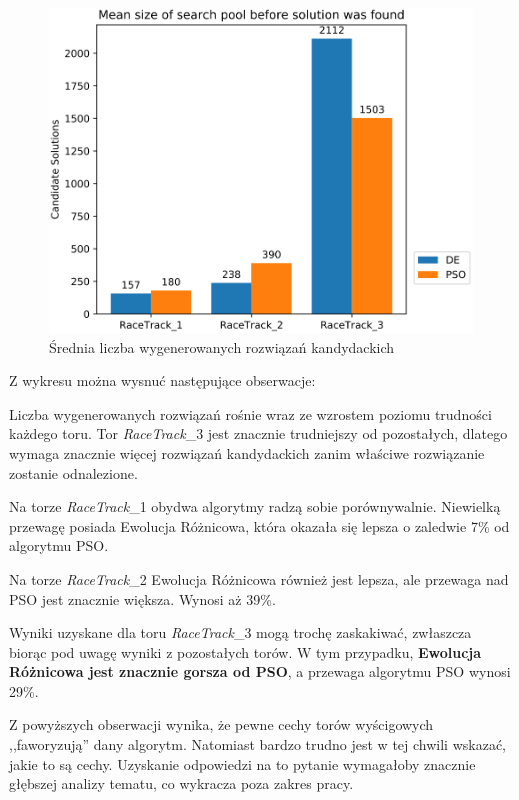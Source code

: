 \vspace{1cm}
\begin{figure}[H]
\centering
\includegraphics[width=15cm]{resources/figures/search_count.png}
\caption{Średnia liczba wygenerowanych rozwiązań kandydackich}
\label{SearchCount}
\end{figure}

Z wykresu można wysnuć następujące obserwacje:
\begin{enumerate*}
\item Liczba wygenerowanych rozwiązań rośnie wraz ze wzrostem poziomu trudności każdego toru. Tor \textit{RaceTrack}\_3 jest znacznie trudniejszy od pozostałych, dlatego wymaga znacznie więcej rozwiązań kandydackich zanim właściwe rozwiązanie zostanie odnalezione.
\item Na torze \textit{RaceTrack}\_1 obydwa algorytmy radzą sobie porównywalnie. Niewielką przewagę posiada Ewolucja Różnicowa, która okazała się lepsza o zaledwie 7\% od algorytmu PSO.
\item Na torze \textit{RaceTrack}\_2 Ewolucja Różnicowa również jest lepsza, ale przewaga nad PSO jest znacznie większa. Wynosi aż 39\%.
\item Wyniki uzyskane dla toru \textit{RaceTrack}\_3 mogą trochę zaskakiwać, zwłaszcza biorąc pod uwagę wyniki z pozostałych torów. W tym przypadku, \textbf{Ewolucja Różnicowa jest znacznie gorsza od PSO}, a przewaga algorytmu PSO wynosi 29\%.
\end{enumerate*}

Z powyższych obserwacji wynika, że pewne cechy torów wyścigowych ,,faworyzują'' dany algorytm. Natomiast bardzo trudno jest w tej chwili wskazać, jakie to są cechy. Uzyskanie odpowiedzi na to pytanie wymagałoby znacznie głębszej analizy tematu, co wykracza poza zakres pracy.

